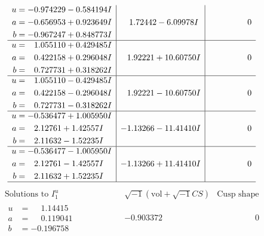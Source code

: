 \documentclass[1p]{elsarticle_modified}
\theoremstyle{definition}
\newcommand{\I}{\sqrt{-1}}
\begin{document}
$$\begin{array}{c|c|c}
\begin{aligned}
u &= -0.974229 - 0.584194 I \\
a &= -0.656953 + 0.923649 I \\
b &= -0.967247 + 0.848773 I\end{aligned}
 & \phantom{-}1.72442 - 6.09978 I & \phantom{-0.000000 } 0 \\ \hline\begin{aligned}
u &= \phantom{-}1.055110 + 0.429485 I \\
a &= \phantom{-}0.422158 + 0.296048 I \\
b &= \phantom{-}0.727731 + 0.318262 I\end{aligned}
 & \phantom{-}1.92221 + 10.60750 I & \phantom{-0.000000 } 0 \\ \hline\begin{aligned}
u &= \phantom{-}1.055110 - 0.429485 I \\
a &= \phantom{-}0.422158 - 0.296048 I \\
b &= \phantom{-}0.727731 - 0.318262 I\end{aligned}
 & \phantom{-}1.92221 - 10.60750 I & \phantom{-0.000000 } 0 \\ \hline\begin{aligned}
u &= -0.536477 + 1.005950 I \\
a &= \phantom{-}2.12761 + 1.42557 I \\
b &= \phantom{-}2.11632 - 1.52235 I\end{aligned}
 & -1.13266 - 11.41410 I & \phantom{-0.000000 } 0 \\ \hline\begin{aligned}
u &= -0.536477 - 1.005950 I \\
a &= \phantom{-}2.12761 - 1.42557 I \\
b &= \phantom{-}2.11632 + 1.52235 I\end{aligned}
 & -1.13266 + 11.41410 I & \phantom{-0.000000 } 0\\
 \hline 
 \end{array}$$\newpage$$\begin{array}{c|c|c}  
\text{Solutions to }I^u_{1}& \I (\text{vol} + \sqrt{-1}CS) & \text{Cusp shape}\\
 \hline 
\begin{aligned}
u &= \phantom{-}1.14415\phantom{ +0.000000I} \\
a &= \phantom{-}0.119041\phantom{ +0.000000I} \\
b &= -0.196758\phantom{ +0.000000I}\end{aligned}
 & -0.903372\phantom{ +0.000000I} & \phantom{-0.000000 } 0 \\ \hline\begin{aligned}

\end{aligned}
\end{array}$$
\end{document}
